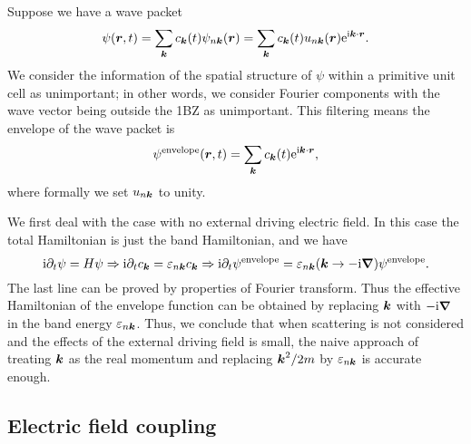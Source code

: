 \documentclass[hyperref, a4paper]{article}
\newcommand*{\ii}{\mathrm{i}}
\newcommand*{\ee}{\mathrm{e}}
\begin{document}
Suppose we have a wave packet 
\begin{equation}
    \psi(\vb*{r}, t) = \sum_{\vb*{k}} c_{\vb*{k}}(t) \psi_{n \vb*{k}}(\vb*{r})
    = \sum_{\vb*{k}} c_{\vb*{k}}(t) u_{n \vb*{k}}(\vb*{r}) \ee^{\ii \vb*{k} \cdot \vb*{r}}.
\end{equation}
We consider the information of the spatial structure of $\psi$
within a primitive unit cell as unimportant; 
in other words, we consider Fourier components with 
the wave vector being outside the 1BZ as unimportant.
This filtering means the envelope of the wave packet is 
\begin{equation}
    \psi^{\text{envelope}}(\vb*{r}, t)
    = \sum_{\vb*{k}} c_{\vb*{k}}(t) \ee^{\ii \vb*{k} \cdot \vb*{r}}, 
\end{equation}
where formally we set $u_{n \vb*{k}}$ to unity.

We first deal with the case with no external driving electric field. 
In this case the total Hamiltonian is just the band Hamiltonian, 
and we have 
\begin{equation}
    \ii \partial_t \psi = H \psi \Rightarrow
    \ii \partial_t c_{\vb*{k}} = \varepsilon_{n \vb*{k}} c_{\vb*{k}} \Rightarrow
    \ii \partial_t \psi^{\text{envelope}} = \varepsilon_{n \vb*{k}}(\vb*{k} \to - \ii \grad) \psi^{\text{envelope}} .
\end{equation}
The last line can be proved by properties of Fourier transform.
Thus the effective Hamiltonian of the envelope function 
can be obtained by replacing $\vb*{k}$ with $- \ii \grad$ 
in the band energy $\varepsilon_{n \vb*{k}}$.
Thus, we conclude that when scattering is not considered 
and the effects of the external driving field is small, 
the naive approach of treating $\vb*{k}$ as the real momentum 
and replacing $\vb*{k}^2 / 2m$ by $\varepsilon_{n \vb*{k}}$
is accurate enough.

\subsection{Electric field coupling}
\end{document}

